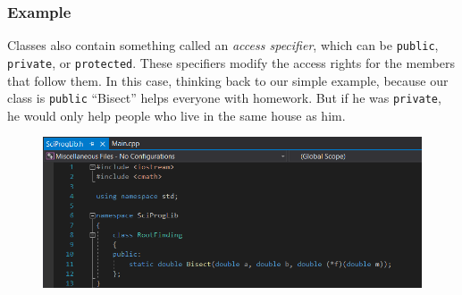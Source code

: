 \documentclass{if-beamer}
\begin{document}
\begin{frame}
	\frametitle{Example}
	Classes also contain something called an \textit{access specifier}, which can be \texttt{public}, \texttt{private}, or \texttt{protected}. These specifiers modify the access rights for the members that follow them. In this case, thinking back to our simple example, because our class is \texttt{public} “Bisect” helps everyone with homework. But if he was \texttt{private}, he would only help people who live in the same house as him. 
	\begin{figure}
		\centering
		\includegraphics[width = \textwidth]{figures/headerfile}
	\end{figure}
\end{frame}
\end{document}
